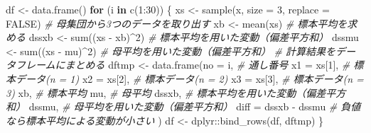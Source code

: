 \documentclass[]{tufte-handout}
\newenvironment{Shaded}{}{}
\newcommand{\AttributeTok}[1]{\textcolor[rgb]{0.49,0.56,0.16}{#1}}
\newcommand{\CommentTok}[1]{\textcolor[rgb]{0.38,0.63,0.69}{\textit{#1}}}
\newcommand{\ConstantTok}[1]{\textcolor[rgb]{0.53,0.00,0.00}{#1}}
\newcommand{\ControlFlowTok}[1]{\textcolor[rgb]{0.00,0.44,0.13}{\textbf{#1}}}
\newcommand{\DecValTok}[1]{\textcolor[rgb]{0.25,0.63,0.44}{#1}}
\newcommand{\FunctionTok}[1]{\textcolor[rgb]{0.02,0.16,0.49}{#1}}
\newcommand{\NormalTok}[1]{#1}
\newcommand{\OtherTok}[1]{\textcolor[rgb]{0.00,0.44,0.13}{#1}}
\newcommand{\SpecialCharTok}[1]{\textcolor[rgb]{0.25,0.44,0.63}{#1}}
\begin{document}
\begin{Shaded}
\begin{Highlighting}[numbers=left,,]
\NormalTok{df }\OtherTok{\textless{}{-}} \FunctionTok{data.frame}\NormalTok{()}
\ControlFlowTok{for}\NormalTok{ (i }\ControlFlowTok{in} \FunctionTok{c}\NormalTok{(}\DecValTok{1}\SpecialCharTok{:}\DecValTok{30}\NormalTok{)) \{}
\NormalTok{  xs }\OtherTok{\textless{}{-}} \FunctionTok{sample}\NormalTok{(x, }\AttributeTok{size =} \DecValTok{3}\NormalTok{, }\AttributeTok{replace =} \ConstantTok{FALSE}\NormalTok{)  }\CommentTok{\# 母集団から3つのデータを取り出す}
\NormalTok{  xb }\OtherTok{\textless{}{-}} \FunctionTok{mean}\NormalTok{(xs)                  }\CommentTok{\# 標本平均を求める}
\NormalTok{  dssxb }\OtherTok{\textless{}{-}} \FunctionTok{sum}\NormalTok{((xs }\SpecialCharTok{{-}}\NormalTok{ xb)}\SpecialCharTok{\^{}}\DecValTok{2}\NormalTok{)       }\CommentTok{\# 標本平均を用いた変動（偏差平方和）}
\NormalTok{  dssmu }\OtherTok{\textless{}{-}} \FunctionTok{sum}\NormalTok{((xs }\SpecialCharTok{{-}}\NormalTok{ mu)}\SpecialCharTok{\^{}}\DecValTok{2}\NormalTok{)       }\CommentTok{\# 母平均を用いた変動（偏差平方和）}
  \CommentTok{\# 計算結果をデータフレームにまとめる}
\NormalTok{  dftmp }\OtherTok{\textless{}{-}} \FunctionTok{data.frame}\NormalTok{(}\AttributeTok{no =}\NormalTok{ i,     }\CommentTok{\# 通し番号}
                      \AttributeTok{x1 =}\NormalTok{ xs[}\DecValTok{1}\NormalTok{], }\CommentTok{\# 標本データ(n = 1)}
                      \AttributeTok{x2 =}\NormalTok{ xs[}\DecValTok{2}\NormalTok{], }\CommentTok{\# 標本データ(n = 2)}
                      \AttributeTok{x3 =}\NormalTok{ xs[}\DecValTok{3}\NormalTok{], }\CommentTok{\# 標本データ(n = 3)}
\NormalTok{                      xb,         }\CommentTok{\# 標本平均}
\NormalTok{                      mu,         }\CommentTok{\# 母平均}
\NormalTok{                      dssxb,      }\CommentTok{\# 標本平均を用いた変動（偏差平方和）}
\NormalTok{                      dssmu,      }\CommentTok{\# 母平均を用いた変動（偏差平方和）}
                      \AttributeTok{diff =}\NormalTok{ dssxb }\SpecialCharTok{{-}}\NormalTok{ dssmu  }\CommentTok{\# 負値なら標本平均による変動が小さい}
\NormalTok{                      )}
\NormalTok{  df }\OtherTok{\textless{}{-}}\NormalTok{ dplyr}\SpecialCharTok{::}\FunctionTok{bind\_rows}\NormalTok{(df, dftmp)}
\NormalTok{\}}


\end{Highlighting}
\end{Shaded}
\end{document}
